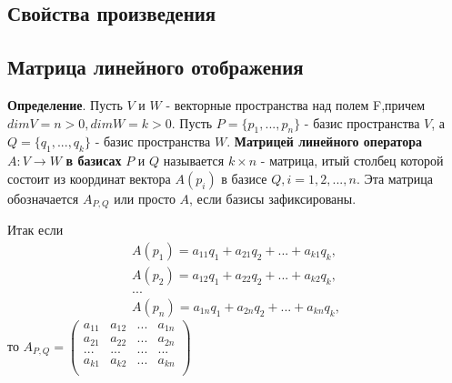 \documentclass[a4paper]{article}
\begin{document}
    \subsection*{Свойства произведения}

    \newpage \begin{center}
                 \begin{Large}
                 \end{Large}
    \end{center}
    \subsection*{Матрица линейного отображения}

    \textbf{Определение}. Пусть $V$ и $W$ - векторные пространства над полем F,\newline причем $dim V = n>0, dim W = k > 0$. Пусть $P = \{ p_1, ..., p_n \}$ - базис пространства $V$, а $Q = \{ q_1, ..., q_k \}$ - базис пространства $W$. \textbf{Матрицей линейного оператора } $A: V \rightarrow W$ \textbf{в базисах} $P$ и $Q$ называется $k \times n$ - матрица, итый столбец которой состоит из координат вектора $A(p_i)$ в базисе $Q, i = 1, 2, ..., n$. Эта матрица обозначается $A_{P,Q}$ или просто $A$, если базисы зафиксированы.

    Итак если \begin{equation}
                  \begin{matrix}
                      A(p_1) = a_{11}q_1 + a_{21}q_2 + ... + a_{k1}q_k, \\
                      A(p_2) = a_{12}q_1 + a_{22}q_2 + ... + a_{k2}q_k, \\
                      ...                                               \\
                      A(p_n) = a_{1n}q_1 + a_{2n}q_2 + ... + a_{kn}q_k,
                  \end{matrix}
    \end{equation}
    то $\displaystyle A_{P,Q} = \begin{pmatrix}
                                    a_{11} & a_{12} & ... & a_{1n} \\
                                    a_{21} & a_{22} & ... & a_{2n} \\
                                    ...    & ...    & ... & ...    \\
                                    a_{k1} & a_{k2} & ... & a_{kn} \\
    \end{pmatrix}$
\end{document}
